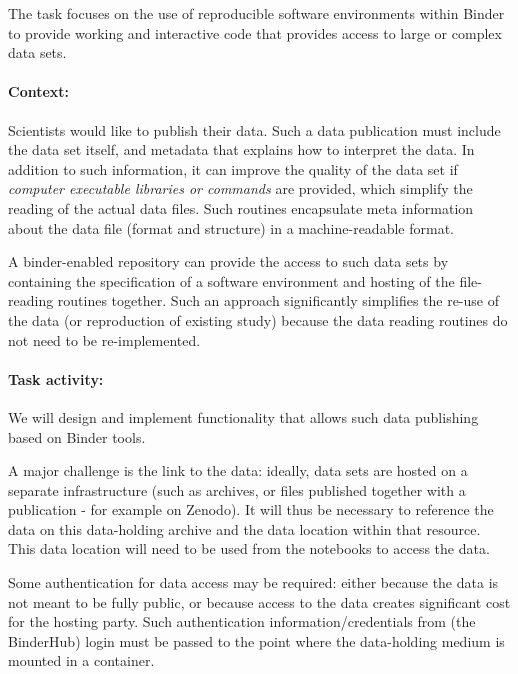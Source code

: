 \begin{task}[
  title=Data publishing,
  id=data-publishing,
  lead=MP,
  PM=8,
  partners={IFR,UIO}
  ]
  The task focuses on the use of reproducible software environments within
  Binder to provide working and interactive code that provides access to large
  or complex data sets.

  \paragraph*{Context:} Scientists would like to publish their data. Such a data
  publication must include the data set itself, and metadata that explains how to
  interpret the data. In addition to such information, it can improve the
  quality of the data set if \emph{computer executable libraries or commands}
  are provided, which simplify the reading of the actual data files. Such
  routines encapsulate meta information about the data file (format and
  structure) in a machine-readable format.

  A binder-enabled repository can provide the access to such data sets by
  containing the specification of a software environment and hosting of the
  file-reading routines together. Such an approach significantly simplifies the
  re-use of the data (or reproduction of existing study) because the data
  reading routines do not need to be re-implemented.

  \paragraph*{Task activity:}
  We will design and implement functionality that allows such data publishing
  based on Binder tools.

  A major challenge is the link to the data: ideally, data sets are hosted on a
  separate infrastructure (such as archives, or files published together with a
  publication - for example on Zenodo). It will thus be necessary to reference
  the data on this data-holding archive and the data location within that resource.
  This data location will need to be used from the notebooks to access
  the data. %

  Some authentication for data access may be required: either because the data
  is not meant to be fully public, or because access to the data creates
  significant cost for the hosting party. Such authentication
  information/credentials from (the BinderHub) login must be passed to the point
  where the data-holding medium is mounted in a container.


\end{task}
